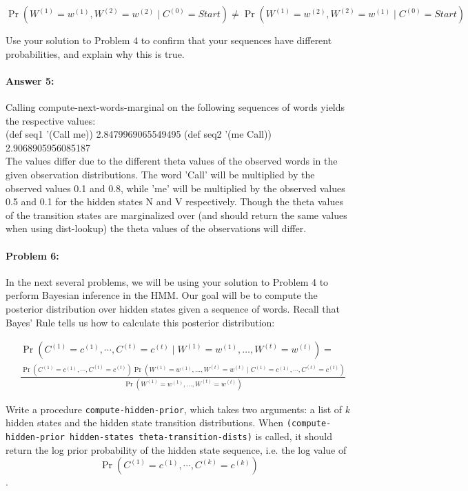 \documentclass[10pt]{article}
\begin{document}
$$\begin{equation}
\nonumber
\Pr(W^{(1)}=w^{(1)}, W^{(2)} =w^{(2)} \mid C^{(0)}=Start ) \neq \Pr(W^{(1)}=w^{(2)}, W^{(2)} =w^{(1)} \mid C^{(0)}=Start )
\end{equation}$$

Use your solution to Problem 4 to confirm that your sequences have
different probabilities, and explain why this is true.

\paragraph{Answer 5:} Calling compute-next-words-marginal on the following sequences of words yields the respective values: 
\\
(def seq1 '(Call me))	 	2.8479969065549495
(def seq2 '(me Call)) 		2.9068905956085187
\\
The values differ due to the different theta values of the observed words in the given observation distributions. The word 'Call' will be multiplied by the observed values 0.1 and 0.8, while 'me' will be multiplied by the observed values 0.5 and 0.1 for the hidden states N and V respectively. Though the theta values of the transition states are marginalized over (and should return the same values when using dist-lookup) the theta values of the observations will differ.

\hrulefill
\paragraph{Problem 6:}

In the next several problems, we will be using your solution to
Problem 4 to perform Bayesian inference in the HMM. Our goal will be
to compute the posterior distribution over hidden states given a
sequence of words. Recall that Bayes' Rule tells us how to calculate
this posterior distribution:

$$\begin{align}
&\Pr(C^{(1)}=c^{(1)},\cdots,C^{(t)}=c^{(t)} \mid W^{(1)}=w^{(1)},\dots,W^{(t)}=w^{(t)} ) = \\ &\frac{\Pr(C^{(1)}=c^{(1)},\cdots,C^{(t)}=c^{(t)}) \Pr( W^{(1)}=w^{(1)},\dots,W^{(t)}=w^{(t)} \mid C^{(1)}=c^{(1)},\cdots,C^{(t)}=c^{(t)})}{\Pr(W^{(1)}=w^{(1)},\dots,W^{(t)}=w^{(t)} )}
\end{align}$$

Write a procedure \texttt{compute-hidden-prior}, which takes two
arguments: a list of $k$ hidden states and the hidden state transition
distributions. When \texttt{(compute-hidden-prior hidden-states
  theta-transition-dists)} is called, it should return the log prior
probability of the hidden state sequence, i.e. the log value of
$$\Pr(C^{(1)}=c^{(1)},\cdots,C^{(k)}=c^{(k)})$$.
\end{document}
